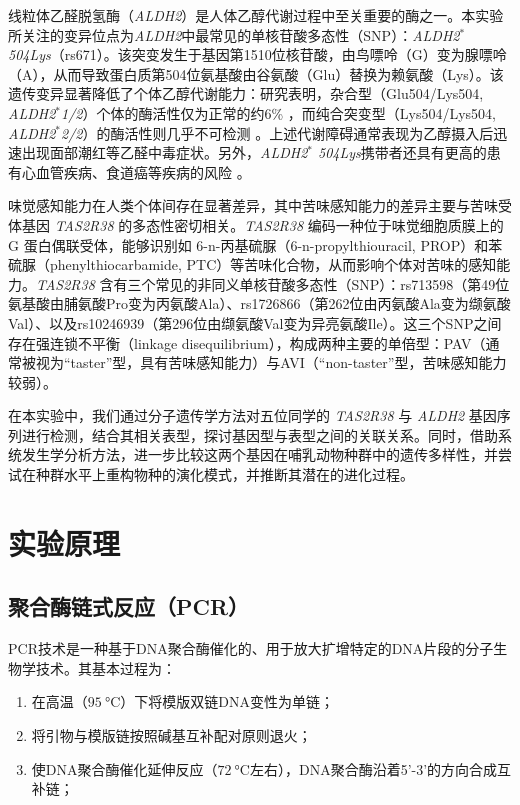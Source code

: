 \documentclass[10pt]{article}
\begin{document}
线粒体乙醛脱氢酶（\textit{ALDH2}）是人体乙醇代谢过程中至关重要的酶之一。本实验所关注的变异位点为\textit{ALDH2}中最常见的单核苷酸多态性（SNP）：\textit{ALDH2$^*$ 504Lys}（rs671）。该突变发生于基因第1510位核苷酸，由鸟嘌呤（G）变为腺嘌呤（A），从而导致蛋白质第504位氨基酸由谷氨酸（Glu）替换为赖氨酸（Lys）。该遗传变异显著降低了个体乙醇代谢能力：研究表明，杂合型（Glu504/Lys504, \textit{ALDH2$^*$1/2}）个体的酶活性仅为正常的约6\% \citep{xiaoMutationMitochondrialAldehyde1996}，而纯合突变型（Lys504/Lys504, \textit{ALDH2$^*$2/2}）的酶活性则几乎不可检测 \citep{crabbGenotypesAldehydeDehydrogenase1989}。上述代谢障碍通常表现为乙醇摄入后迅速出现面部潮红等乙醛中毒症状。另外，\textit{ALDH2$^*$ 504Lys}携带者还具有更高的患有心血管疾病、食道癌等疾病的风险 \citep{liMitochondrialAldehydeDehydrogenase22006,yokoyamaAlcoholAldehydeDehydrogenase2001}。

味觉感知能力在人类个体间存在显著差异，其中苦味感知能力的差异主要与苦味受体基因 \textit{TAS2R38} 的多态性密切相关。\textit{TAS2R38} 编码一种位于味觉细胞质膜上的 G 蛋白偶联受体，能够识别如 6-n-丙基硫脲（6-n-propylthiouracil, PROP）和苯硫脲（phenylthiocarbamide, PTC）等苦味化合物，从而影响个体对苦味的感知能力。\textit{TAS2R38} 含有三个常见的非同义单核苷酸多态性（SNP）：rs713598（第49位氨基酸由脯氨酸Pro变为丙氨酸Ala）、rs1726866（第262位由丙氨酸Ala变为缬氨酸Val）、以及rs10246939（第296位由缬氨酸Val变为异亮氨酸Ile）。这三个SNP之间存在强连锁不平衡（linkage disequilibrium），构成两种主要的单倍型：PAV（通常被视为“taster”型，具有苦味感知能力）与AVI（“non-taster”型，苦味感知能力较弱）\citep{rissoGlobalDiversityTAS2R382016}。

在本实验中，我们通过分子遗传学方法对五位同学的 \textit{TAS2R38} 与 \textit{ALDH2} 基因序列进行检测，结合其相关表型，探讨基因型与表型之间的关联关系。同时，借助系统发生学分析方法，进一步比较这两个基因在哺乳动物种群中的遗传多样性，并尝试在种群水平上重构物种的演化模式，并推断其潜在的进化过程。

\section{实验原理}

\subsection{聚合酶链式反应（PCR）}
PCR技术是一种基于DNA聚合酶催化的、用于放大扩增特定的DNA片段的分子生物学技术。其基本过程为：
\begin{enumerate}
    \item 在高温（$\qty{95}{\celsius}$）下将模版双链DNA变性为单链；
    \item 将引物与模版链按照碱基互补配对原则退火；
    \item 使DNA聚合酶催化延伸反应（$\qty{72}{\celsius}$左右），DNA聚合酶沿着5'-3'的方向合成互补链；
\end{enumerate}
\end{document}
